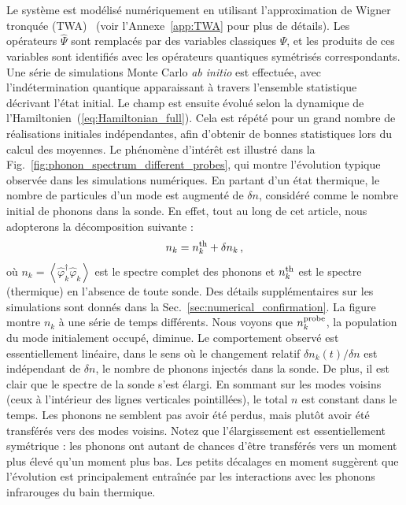 \documentclass[aps,prd,notitlepage,amsfonts,amssymb,amsmath,nofootinbib,superscriptaddress,longbibliography]{revtex4-2}
\newcommand{\trad}[1]{\textcolor{tradcolor}{#1}}
\begin{document}
\trad{Le système est modélisé numériquement en utilisant l'approximation de Wigner tronquée (TWA)~\cite{steelDynamicalQuantumNoise1998} (voir l'Annexe~\ref{app:TWA} pour plus de détails). Les opérateurs $\hat{\Psi}$ sont remplacés par des variables classiques $\Psi$, et les produits de ces variables sont identifiés avec les opérateurs quantiques symétrisés correspondants. Une série de simulations Monte Carlo \textit{ab initio} est effectuée, avec l'indétermination quantique apparaissant à travers l'ensemble statistique décrivant l'état initial. Le champ est ensuite évolué selon la dynamique de l'Hamiltonien~(\ref{eq:Hamiltonian_full}). Cela est répété pour un grand nombre de réalisations initiales indépendantes, afin d'obtenir de bonnes statistiques lors du calcul des moyennes.
Le phénomène d'intérêt est illustré dans la Fig.~\ref{fig:phonon_spectrum_different_probes}, qui montre l'évolution typique observée dans les simulations numériques. En partant d'un état thermique, le nombre de particules d'un mode est augmenté de $\delta n$, considéré comme le nombre initial de phonons dans la sonde. En effet, tout au long de cet article, nous adopterons la décomposition suivante :
\begin{equation*}
    n_{k} = n_{k}^{\rm th} + \delta n_{k} \,,
\end{equation*}
où $n_{k} = \left\langle \hat{\varphi}_{k}^{\dagger}\hat{\varphi}_{k} \right\rangle$ est le spectre complet des phonons et $n_{k}^{\rm th}$ est le spectre (thermique) en l'absence de toute sonde.
Des détails supplémentaires sur les simulations sont donnés dans la Sec.~\ref{sec:numerical_confirmation}. La figure montre $n_{k}$ à une série de temps différents. Nous voyons que $n_{k}^{\rm probe}$, la population du mode initialement occupé, diminue. Le comportement observé est essentiellement linéaire, dans le sens où le changement relatif $\delta n_{k}(t) / \delta n$ est indépendant de $\delta n$, le nombre de phonons injectés dans la sonde. De plus, il est clair que le spectre de la sonde s'est élargi. En sommant sur les modes voisins (ceux à l'intérieur des lignes verticales pointillées), le total $n$ est constant dans le temps. Les phonons ne semblent pas avoir été perdus, mais plutôt avoir été transférés vers des modes voisins. Notez que l'élargissement est essentiellement symétrique : les phonons ont autant de chances d'être transférés vers un moment plus élevé qu'un moment plus bas. Les petits décalages en moment suggèrent que l'évolution est principalement entraînée par les interactions avec les phonons infrarouges du bain thermique.
} 
\end{document}
